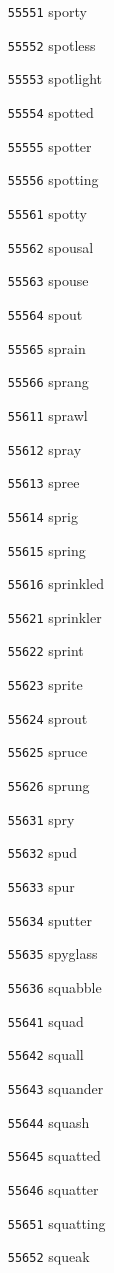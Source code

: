 \documentclass[twoside,11pt]{article}
\begin{document}
\begin{multicols}{5}
\begin{enumerate}
\item[\texttt{55551}] sporty
\item[\texttt{55552}] spotless
\item[\texttt{55553}] spotlight
\item[\texttt{55554}] spotted
\item[\texttt{55555}] spotter
\item[\texttt{55556}] spotting
\item[\texttt{55561}] spotty
\item[\texttt{55562}] spousal
\item[\texttt{55563}] spouse
\item[\texttt{55564}] spout
\item[\texttt{55565}] sprain
\item[\texttt{55566}] sprang
\item[\texttt{55611}] sprawl
\item[\texttt{55612}] spray
\item[\texttt{55613}] spree
\item[\texttt{55614}] sprig
\item[\texttt{55615}] spring
\item[\texttt{55616}] sprinkled
\item[\texttt{55621}] sprinkler
\item[\texttt{55622}] sprint
\item[\texttt{55623}] sprite
\item[\texttt{55624}] sprout
\item[\texttt{55625}] spruce
\item[\texttt{55626}] sprung
\item[\texttt{55631}] spry
\item[\texttt{55632}] spud
\item[\texttt{55633}] spur
\item[\texttt{55634}] sputter
\item[\texttt{55635}] spyglass
\item[\texttt{55636}] squabble
\item[\texttt{55641}] squad
\item[\texttt{55642}] squall
\item[\texttt{55643}] squander
\item[\texttt{55644}] squash
\item[\texttt{55645}] squatted
\item[\texttt{55646}] squatter
\item[\texttt{55651}] squatting
\item[\texttt{55652}] squeak

\end{enumerate}
\end{multicols}
\end{document}
